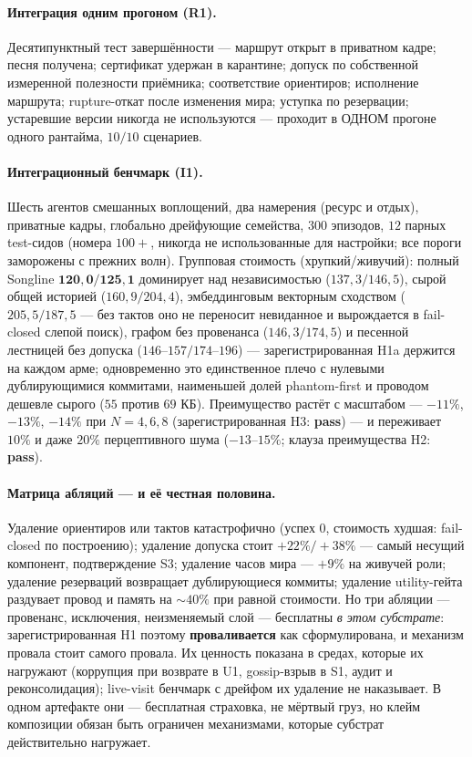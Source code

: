 \documentclass{article}
\begin{document}
\paragraph{Интеграция одним прогоном (R1).} Десятипунктный тест
завершённости --- маршрут открыт в приватном кадре; песня получена;
сертификат удержан в карантине; допуск по собственной измеренной
полезности приёмника; соответствие ориентиров; исполнение маршрута;
rupture-откат после изменения мира; уступка по резервации;
устаревшие версии никогда не используются --- проходит в ОДНОМ
прогоне одного рантайма, $10/10$ сценариев.

\paragraph{Интеграционный бенчмарк (I1).} Шесть агентов смешанных
воплощений, два намерения (ресурс и отдых), приватные кадры,
глобально дрейфующие семейства, $300$ эпизодов, $12$ парных
test-сидов (номера $100{+}$, никогда не использованные для настройки;
все пороги заморожены с прежних волн). Групповая стоимость
(хрупкий/живучий): полный Songline $\mathbf{120{,}0/125{,}1}$
доминирует над независимостью ($137{,}3/146{,}5$), сырой общей
историей ($160{,}9/204{,}4$), эмбеддинговым векторным сходством
($205{,}5/187{,}5$ --- без тактов оно не переносит невиданное и
вырождается в fail-closed слепой поиск), графом без провенанса
($146{,}3/174{,}5$) и песенной лестницей без допуска
($146$--$157/174$--$196$) --- зарегистрированная H1a держится на
каждом арме; одновременно это единственное плечо с
нулевыми дублирующимися коммитами, наименьшей долей phantom-first и
проводом дешевле сырого ($55$ против $69$ КБ). Преимущество растёт с
масштабом --- $-11\%$, $-13\%$, $-14\%$ при $N = 4, 6, 8$
(зарегистрированная H3: \textbf{pass}) --- и переживает $10\%$ и
даже $20\%$ перцептивного шума ($-13$--$15\%$; клауза преимущества
H2: \textbf{pass}).

\paragraph{Матрица абляций --- и её честная половина.} Удаление
ориентиров или тактов катастрофично (успех $0$, стоимость худшая:
fail-closed по построению); удаление допуска стоит $+22\%/+38\%$ ---
самый несущий компонент, подтверждение S3; удаление часов мира ---
$+9\%$ на живучей роли; удаление резерваций возвращает дублирующиеся
коммиты; удаление utility-гейта раздувает провод и память на
${\sim}40\%$ при равной стоимости. Но три абляции --- провенанс,
исключения, неизменяемый слой --- бесплатны \emph{в этом субстрате}:
зарегистрированная H1 поэтому \textbf{проваливается} как
сформулирована, и механизм провала стоит самого провала. Их ценность
показана в средах, которые их нагружают (коррупция при возврате в
U1, gossip-взрыв в S1, аудит и реконсолидация); live-visit
бенчмарк с дрейфом их удаление не наказывает. В одном артефакте они
--- бесплатная страховка, не мёртвый груз, но клейм композиции обязан
быть ограничен механизмами, которые субстрат действительно нагружает.
\end{document}

